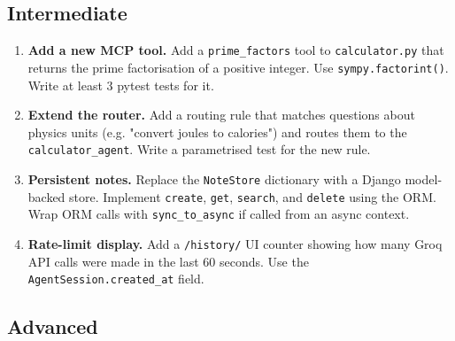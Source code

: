 \documentclass[11pt,a4paper]{article}
\begin{document}
\subsection{Intermediate}

\begin{enumerate}[leftmargin=*, label=\textbf{I\arabic*.}]
  \item \textbf{Add a new MCP tool.} Add a \texttt{prime\_factors} tool to
        \texttt{calculator.py} that returns the prime factorisation of a
        positive integer. Use \texttt{sympy.factorint()}.
        Write at least 3 pytest tests for it.

  \item \textbf{Extend the router.} Add a routing rule that matches questions
        about physics units (e.g. "convert joules to calories") and routes
        them to the \texttt{calculator\_agent}.
        Write a parametrised test for the new rule.

  \item \textbf{Persistent notes.} Replace the \texttt{NoteStore} dictionary
        with a Django model-backed store. Implement \texttt{create},
        \texttt{get}, \texttt{search}, and \texttt{delete} using the ORM.
        Wrap ORM calls with \texttt{sync\_to\_async} if called from an async
        context.

  \item \textbf{Rate-limit display.} Add a \texttt{/history/} UI counter
        showing how many Groq API calls were made in the last 60 seconds.
        Use the \texttt{AgentSession.created\_at} field.
\end{enumerate}

\subsection{Advanced}
\end{document}
